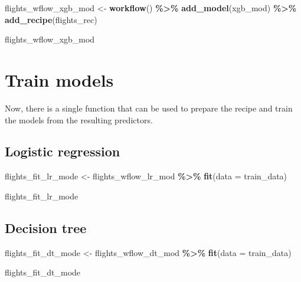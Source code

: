 \documentclass[
]{book}
\newenvironment{Shaded}{\begin{snugshade}}{\end{snugshade}}
\newcommand{\DataTypeTok}[1]{\textcolor[rgb]{0.13,0.29,0.53}{#1}}
\newcommand{\KeywordTok}[1]{\textcolor[rgb]{0.13,0.29,0.53}{\textbf{#1}}}
\newcommand{\NormalTok}[1]{#1}
\newcommand{\OperatorTok}[1]{\textcolor[rgb]{0.81,0.36,0.00}{\textbf{#1}}}
\newcommand{\StringTok}[1]{\textcolor[rgb]{0.31,0.60,0.02}{#1}}
\begin{document}
\begin{Shaded}
\begin{Highlighting}[]
\NormalTok{flights\_wflow\_xgb\_mod \textless{}{-}}
\StringTok{  }\KeywordTok{workflow}\NormalTok{() }\OperatorTok{\%\textgreater{}\%}
\StringTok{  }\KeywordTok{add\_model}\NormalTok{(xgb\_mod) }\OperatorTok{\%\textgreater{}\%}
\StringTok{  }\KeywordTok{add\_recipe}\NormalTok{(flights\_rec)}

\NormalTok{flights\_wflow\_xgb\_mod}
\end{Highlighting}
\end{Shaded}

\hypertarget{train-models}{%
\section{Train models}\label{train-models}}

Now, there is a single function that can be used to prepare the recipe and train the models from the resulting predictors.

\hypertarget{logistic-regression-2}{%
\subsection{Logistic regression}\label{logistic-regression-2}}

\begin{Shaded}
\begin{Highlighting}[]
\NormalTok{flights\_fit\_lr\_mode \textless{}{-}}
\StringTok{  }\NormalTok{flights\_wflow\_lr\_mod }\OperatorTok{\%\textgreater{}\%}
\StringTok{  }\KeywordTok{fit}\NormalTok{(}\DataTypeTok{data =}\NormalTok{ train\_data)}

\NormalTok{flights\_fit\_lr\_mode}
\end{Highlighting}
\end{Shaded}

\hypertarget{decision-tree-2}{%
\subsection{Decision tree}\label{decision-tree-2}}

\begin{Shaded}
\begin{Highlighting}[]
\NormalTok{flights\_fit\_dt\_mode \textless{}{-}}
\StringTok{  }\NormalTok{flights\_wflow\_dt\_mod }\OperatorTok{\%\textgreater{}\%}
\StringTok{  }\KeywordTok{fit}\NormalTok{(}\DataTypeTok{data =}\NormalTok{ train\_data)}

\NormalTok{flights\_fit\_dt\_mode}
\end{Highlighting}
\end{Shaded}
\end{document}
